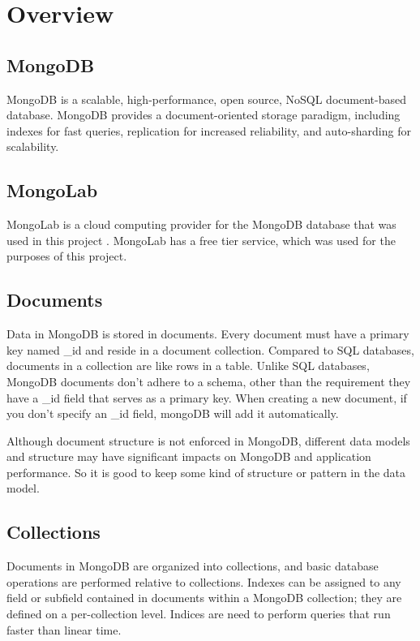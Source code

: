 \lstset{breaklines=true}

\section{Overview}
\subsection{MongoDB}
MongoDB is a scalable, high-performance, open source, NoSQL document-based database. MongoDB provides a document-oriented storage paradigm, including indexes for fast queries, replication for increased reliability, and auto-sharding for scalability.  \cite{mongodb}

\subsection{MongoLab}
MongoLab is a cloud computing provider for the MongoDB database that was used in this project \cite{mongolab}.  MongoLab has a free tier service, which was used for the purposes of this project.

\subsection{Documents}
Data in MongoDB is stored in documents.  Every document must have a primary key named {\_id} and reside in a document collection. Compared to SQL databases, documents in a collection are like rows in a table.  Unlike SQL databases, MongoDB documents don't adhere to a schema, other than the requirement they have a {\_id} field that serves as a primary key.  When creating a new document, if you don't specify an {\_id} field, mongoDB will add it automatically.  \cite{mongodb}

Although document structure is not enforced in MongoDB, different data models and structure may have significant impacts on MongoDB and application performance. So it is good to keep some kind of structure or pattern in the data model.

\subsection{Collections}
Documents in MongoDB are organized into collections, and basic database operations are performed relative to collections. Indexes can be assigned to any field or subfield contained in documents within a MongoDB collection; they are defined on a per-collection level. Indices are need to perform queries that run faster than linear time.  \cite{mongodb}   

